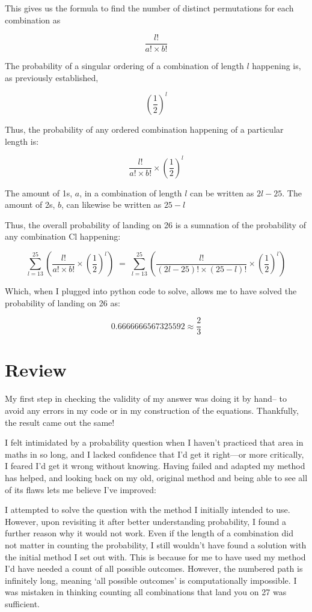 \documentclass[11pt]{article}
\newcommand{\keywordfont}{\textsc}
\newcommand{\keyword}[1]{%
  \marginpar{\raggedright\small\keywordfont{#1}}}
\begin{document}
This gives us the formula to find the number of distinct permutations for each combination as

$$\frac{l!}{a! \times b!}$$

The probability of a singular ordering of a combination of length $l$ happening is, as previously established, 

$$\left( \frac{1}{2} \right) ^l$$

Thus, the probability of any ordered combination happening of a particular length is:

$$\frac{l!}{a! \times b!} \times \left( \frac{1}{2} \right) ^l$$


The amount of 1s, $a$, in a combination of length $l$ can be written as $2 l -25$. The amount of 2s, $b$, can likewise be written as $25 - l$

Thus, the overall probability of landing on 26 is a sumnation of the probability of any combination Cl happening:

\[
\sum_{l=13}^{25} \left( \frac{l!}{a! \times b!} \times \left( \frac{1}{2} \right) ^l \right) \; = \; \sum_{l=13}^{25} \left( \frac{l!}{ (2l -25)! \times (25-l)!} \times \left( \frac{1}{2} \right) ^l \right) 
\]

Which, when I plugged into python code to solve, allows me to have solved the probability of landing on 26 as:

$$0.6666666567325592 \approx \frac{2}{3}$$



\section{Review}

My first step in checking \keyword{Check} the validity of my answer was doing it by hand-- to avoid any errors in my code or in my construction of the equations. Thankfully, the result came out the same!

I felt intimidated by a probability question when \keyword{Reflect} I haven’t practiced that area in maths in so long, and I lacked confidence that I’d get it right—or more critically, I feared I’d get it wrong without knowing. Having failed and adapted my method has helped, and looking back on my old, original method and being able to see all of its flaws lets me believe I’ve improved:

I attempted to solve the question with the method I initially intended to use. However, upon revisiting it after better understanding probability, I found a further reason why it would not work. Even if the length of a combination did not matter in counting the probability, I still wouldn’t have found a solution with the initial method I set out with. This is because for me to have used my method I’d have needed a count of all possible outcomes. However, the numbered path is infinitely long, meaning ‘all possible outcomes’ is computationally impossible. I was mistaken in thinking counting all combinations that land you on 27 was sufficient.
\end{document}
